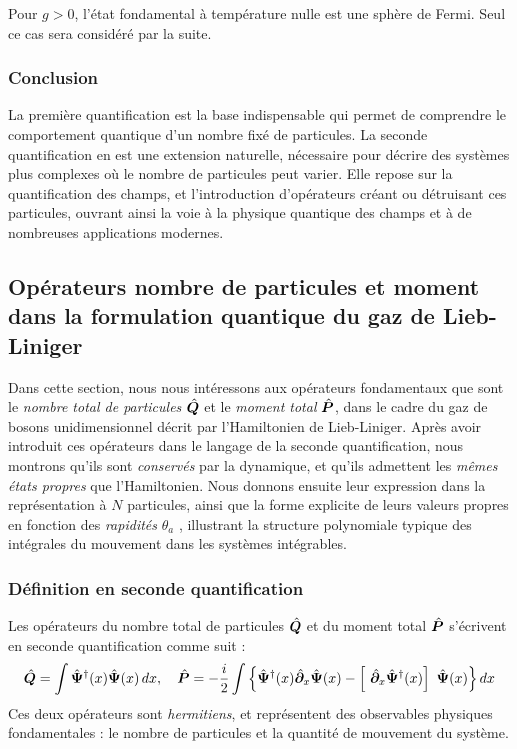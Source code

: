 Pour $g > 0$, l'état fondamental à température nulle est une sphère de Fermi. Seul ce cas sera considéré par la suite.


\subsubsection*{Conclusion}

La première quantification est la base indispensable qui permet de comprendre le comportement quantique d’un nombre fixé de particules. La seconde quantification en est une extension naturelle, nécessaire pour décrire des systèmes plus complexes où le nombre de particules peut varier. Elle repose sur la quantification des champs, et l’introduction d’opérateurs créant ou détruisant ces particules, ouvrant ainsi la voie à la physique quantique des champs et à de nombreuses applications modernes.


\subsection{Opérateurs nombre de particules et moment dans la formulation quantique du gaz de Lieb-Liniger}

Dans cette section, nous nous intéressons aux opérateurs fondamentaux que sont le {\em nombre total de particules} $\hat{\bm{Q}}$ et le {\em moment total} $\hat{\bm{P}}$, dans le cadre du gaz de bosons unidimensionnel décrit par l’Hamiltonien de Lieb-Liniger. Après avoir introduit ces opérateurs dans le langage de la seconde quantification, nous montrons qu’ils sont {\em conservés} par la dynamique, et qu’ils admettent les {\em mêmes états propres} que l’Hamiltonien. Nous donnons ensuite leur expression dans la représentation à  $N$ particules, ainsi que la forme explicite de leurs valeurs propres en fonction des {\em rapidités} $\theta_a$ , illustrant la structure polynomiale typique des intégrales du mouvement dans les systèmes intégrables.

\subsubsection{Définition en seconde quantification}

Les opérateurs du nombre total de particules $\hat{\bm{Q}}$ et du moment total $\hat{\bm{P}}$ s’écrivent en seconde quantification comme suit :
\begin{eqnarray}
	\operator{Q}  =  \int \operator{\Psi}^\dag (x) \operator{\Psi} (x) \, d x, \quad 
	\operator{P}  =  - \frac{i}2 \int \left \{  \operator{\Psi}^\dag(x) \operator{\partial}_x \operator{\Psi}(x) - \left [ \operator{\partial}_x \operator{\Psi}^\dag(x)\right ] \operator{\Psi}(x)\right \} dx \label{eq.1.7}
\end{eqnarray}
Ces deux opérateurs sont {\em hermitiens}, et représentent des observables physiques fondamentales : le nombre de particules et la quantité de mouvement du système.

